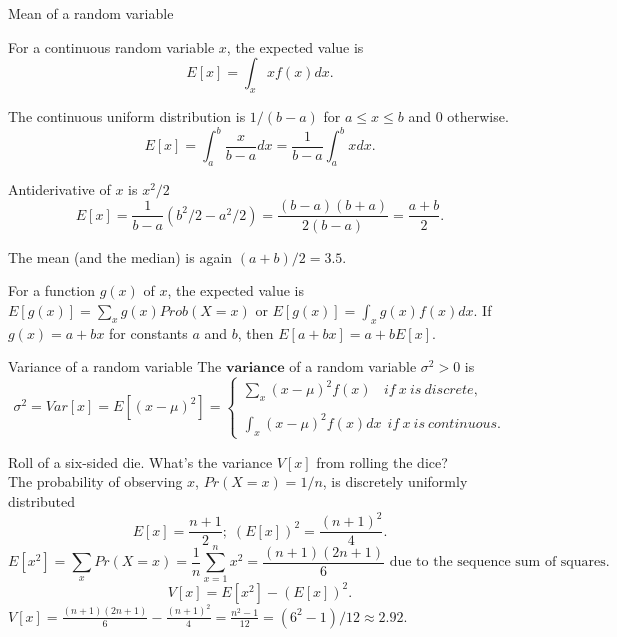 \documentclass[11pt,table]{beamer}
\begin{document}
\begin{frame}{Mean of a random variable}

For a continuous random variable $x$, the expected value is $$E[x]={\int_{x}xf(x)dx.}$$

\begin{example} 
\scriptsize
\renewcommand{\baselinestretch}{1}
The continuous uniform distribution is $1/(b-a)$ for $a\leq x\leq b$ and $0$ otherwise.\\

$$E[x]={\int_{a}^b\frac{x}{b-a}dx}={\frac{1}{b-a}\int_{a}^bxdx}.$$

Antiderivative of $x$ is $x^2/2$
$$E[x]={\frac{1}{b-a} (b^2/2-a^2/2)}=\frac{(b-a)(b+a)}{2(b-a)}=\frac{a+b}{2}.$$


The mean (and the median) is again $(a+b)/2=3.5$.
\end{example}
\scriptsize
For a function $g(x)$ of $x$, the expected value is $E[g(x)]=\sum_{x}g(x) Prob(X = x)$ or $E[g(x)]=\int_{x}g(x)f(x)dx$. If $g(x) = a + bx$ for constants $a$ and $b$, then $E[a + bx] = a + bE[x]$.
\end{frame}



\begin{frame}{Variance of a random variable}
The $\textbf{variance}$ of a random variable $\sigma^{2}>0$ is
\begin{equation}\label{eq0} \sigma^2=Var[x] = E[(x - \mu)^{2}]=\left\{
 \begin{array}{ll}
 {\sum_{x}(x - \mu)^{2}f(x)~~~~if~ x~ is~ discrete, } \\
 {~}\\
 {\int_{x}(x - \mu)^{2}f(x)dx~~if~ x~ is~ continuous.}
 \end{array}
 \right.
\end{equation}
\begin{example} 
\scriptsize
\renewcommand{\baselinestretch}{1}
Roll of a six-sided die. What's the variance $V[x]$ from rolling the dice?\\
The probability of observing $x$, $Pr(X=x)=1/n$, is discretely uniformly distributed
$$E[x]=\frac{n+1}{2}; \; (E[x])^2=\frac{(n+1)^2}{4}.$$
$$E[x^2]=\sum_xPr(X=x)=\frac{1}{n}\sum_{x=1}^nx^2=\frac{(n+1)(2n+1)}{6} \text{ due to the sequence sum of squares}.$$
$$V[x] = E[x^{2}] - (E[x])^2.$$
 $V[x]=\frac{(n+1)(2n+1)}{6}-\frac{(n+1)^2}{4}=\frac{n^2-1}{12}=(6^2-1)/12\approx2.92.$\\
\end{example}

\end{frame}
\end{document}
